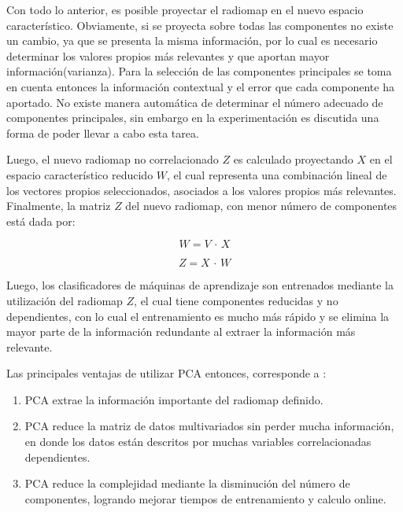 Con todo lo anterior, es posible proyectar el radiomap en el nuevo espacio característico. Obviamente, si se proyecta sobre todas las componentes no existe un cambio, ya que se presenta la misma información, por lo cual es necesario determinar los valores propios más relevantes y que aportan mayor información(varianza). Para la selección de las componentes principales se toma en cuenta entonces la información contextual y el error que cada componente ha aportado. No existe manera automática de determinar el número adecuado de componentes principales, sin embargo en la experimentación es discutida una forma de poder llevar a cabo esta tarea. 

Luego, el nuevo radiomap no correlacionado $Z$ es calculado proyectando $X$ en el espacio característico reducido $W$, el cual representa una combinación lineal de los vectores propios seleccionados, asociados a los valores propios más relevantes. Finalmente, la matriz $Z$ del nuevo radiomap, con menor número de componentes está dada por:

\begin{equation} \label{eq2}
W = V \, \cdot \, X
\end{equation}

\begin{equation} 
Z = X  \, \cdot \, W
\end{equation}

Luego, los clasificadores de máquinas de aprendizaje son entrenados mediante la utilización del radiomap $Z$, el cual tiene componentes reducidas y no dependientes, con lo cual el entrenamiento es mucho más rápido y se elimina la mayor parte de la información redundante al extraer la información más relevante.

Las principales ventajas de utilizar PCA entonces, corresponde a \citep{7743586}:

\begin{enumerate}
\item PCA extrae la información importante del radiomap definido.

\item PCA reduce la matriz de datos multivariados sin perder mucha información, en donde los datos están descritos por muchas variables correlacionadas dependientes.

\item PCA reduce la complejidad mediante la disminución del número de componentes, logrando mejorar tiempos de entrenamiento y calculo online.
\end{enumerate}



